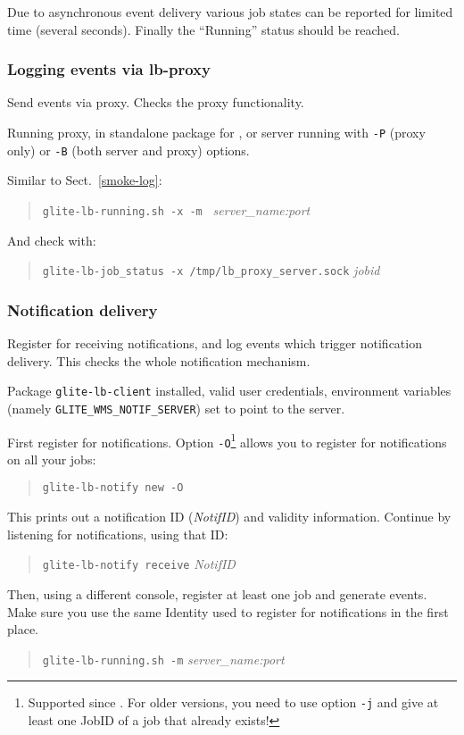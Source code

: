 \result
Due to asynchronous event
delivery various job states can be reported for limited time (several seconds).
Finally the
``Running'' status should be reached.

\subsubsection{Logging events via lb-proxy}

Send events via \LB proxy. Checks the proxy functionality.

\req Running \LB proxy, in standalone package for , or
\LB server running with \verb'-P' (proxy only) or \verb'-B' (both server and proxy)
options.\footnotemark[\theexamplesfootnote]

\how Similar to Sect.~\ref{smoke-log}:
\begin{quote}
\verb'glite-lb-running.sh -x -m ' \emph{server\_name:port}
\end{quote}

And check with:
\begin{quote}
\verb'glite-lb-job_status -x /tmp/lb_proxy_server.sock' \emph{jobid}
\end{quote}


\subsubsection{Notification delivery}

Register for receiving notifications, and log events which trigger
notification delivery. This checks the whole notification mechanism.

\req Package \texttt{glite-lb-client} installed, valid user credentials, environment variables (namely \texttt{GLITE\_WMS\_NOTIF\_SERVER}) set to point to the \LB server.

\how
First register for notifications. Option \texttt{-O}\footnote{Supported since . For older versions, you need to use option \texttt{-j} and give at least one JobID of a job that already exists!} allows you to register for notifications on all your jobs:
\begin{quote}
\texttt{glite-lb-notify new -O}
\end{quote}
This prints out a notification ID (\emph{NotifID}) and validity information. Continue by listening for notifications, using that ID:
\begin{quote}
\texttt{glite-lb-notify receive} \emph{NotifID}
\end{quote}
Then, using a different console, register at least one job and generate events. Make sure you use the same Identity used to register for notifications in the first place.
\begin{quote}
\texttt{glite-lb-running.sh -m} \emph{server\_name:port}
\end{quote}

